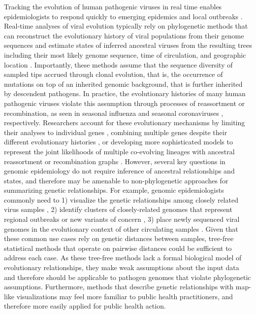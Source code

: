 \documentclass[10pt,letterpaper]{article}
\begin{document}
Tracking the evolution of human pathogenic viruses in real time enables epidemiologists to respond quickly to emerging epidemics and local outbreaks \cite{Grubaugh2019}.
Real-time analyses of viral evolution typically rely on phylogenetic methods that can reconstruct the evolutionary history of viral populations from their genome sequences and estimate states of inferred ancestral viruses from the resulting trees including their most likely genome sequence, time of circulation, and geographic location \cite{Volz2013,Baele2017,Sagulenko2018}.
Importantly, these methods assume that the sequence diversity of sampled tips accrued through clonal evolution, that is, the occurrence of mutations on top of an inherited genomic background, that is further inherited by descendent pathogens.
In practice, the evolutionary histories of many human pathogenic viruses violate this assumption through processes of reassortment or recombination, as seen in seasonal influenza \cite{Nelson2008,Marshall2013} and seasonal coronaviruses \cite{Su2016}, respectively.
Researchers account for these evolutionary mechanisms by limiting their analyses to individual genes \cite{Lemey2007,Bhatt2011}, combining multiple genes despite their different evolutionary histories \cite{Wiens1998}, or developing more sophisticated models to represent the joint likelihoods of multiple co-evolving lineages with ancestral reassortment or recombination graphs \cite{Barrat-Charlaix2022,Muller2022}.
However, several key questions in genomic epidemiology do not require inference of ancestral relationships and states, and therefore may be amenable to non-phylogenetic approaches for summarizing genetic relationships.
For example, genomic epidemiologists commonly need to 1) visualize the genetic relationships among closely related virus samples \cite{Argimon2016,Campbell2021}, 2) identify clusters of closely-related genomes that represent regional outbreaks or new variants of concern \cite{OToole2022,McBroome2022,Stoddard2022,Tran-Kiem2023}, 3) place newly sequenced viral genomes in the evolutionary context of other circulating samples \cite{OToole2021,Turakhia2021,Aksamentov2021}.
Given that these common use cases rely on genetic distances between samples, tree-free statistical methods that operate on pairwise distances could be sufficient to address each case.
As these tree-free methods lack a formal biological model of evolutionary relationships, they make weak assumptions about the input data and therefore should be applicable to pathogen genomes that violate phylogenetic assumptions.
Furthermore, methods that describe genetic relationships with map-like visualizations may feel more familiar to public health practitioners, and therefore more easily applied for public health action.
\end{document}
